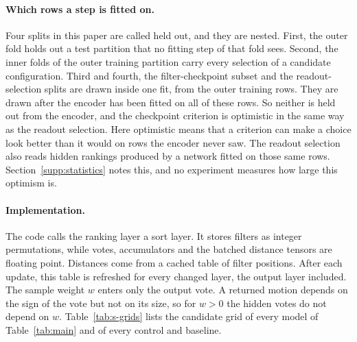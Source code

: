 \paragraph{Which rows a step is fitted on.} Four splits in this paper are called held out, and they are nested. First, the outer fold holds out a test partition that no fitting step of that fold sees. Second, the inner folds of the outer training partition carry every selection of a candidate configuration. Third and fourth, the filter-checkpoint subset and the readout-selection splits are drawn inside one fit, from the outer training rows. They are drawn after the encoder has been fitted on all of these rows. So neither is held out from the encoder, and the checkpoint criterion is optimistic in the same way as the readout selection. Here optimistic means that a criterion can make a choice look better than it would on rows the encoder never saw. The readout selection also reads hidden rankings produced by a network fitted on those same rows. Section~\ref{supp:statistics} notes this, and no experiment measures how large this optimism is.

\paragraph{Implementation.} The code calls the ranking layer a sort layer. It stores filters as integer permutations, while votes, accumulators and the batched distance tensors are floating point. Distances come from a cached table of filter positions. After each update, this table is refreshed for every changed layer, the output layer included. The sample weight $w$ enters only the output vote. A returned motion depends on the sign of the vote but not on its size, so for $w>0$ the hidden votes do not depend on $w$. Table~\ref{tab:s-grids} lists the candidate grid of every model of Table~\ref{tab:main} and of every control and baseline.

